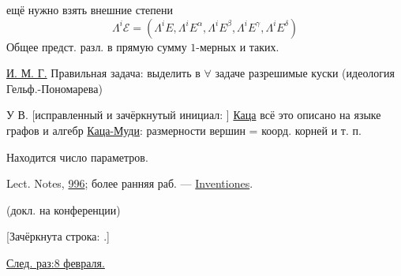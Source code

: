 ещё нужно взять внешние степени
\begin{equation*}
\Lambda^i\mathcal E=
(\Lambda^i E,\Lambda^i E^\alpha,\Lambda^i E^\beta,
\Lambda^i E^\gamma,\Lambda^i E^\delta)
\end{equation*}
Общее предст. разл. в прямую сумму $1$-мерных и таких.

\underline{И. М. Г.}
Правильная задача: выделить в $\forall$ задаче разрешимые
куски (идеология Гельф.-Пономарева)

У В. [исправленный и зачёркнутый инициал:
]
\underline{Каца} всё это описано на языке графов и алгебр
\underline{Каца-Муди}:
размерности вершин = коорд. корней и т. п.

Находится число параметров.

Lect. Notes, \underline{996}; более ранняя раб. — \underline{Inventiones}.

(докл. на конференции)

[Зачёркнута строка:
.]


\underline{След. раз:}\quad \underline{8 февраля.}

